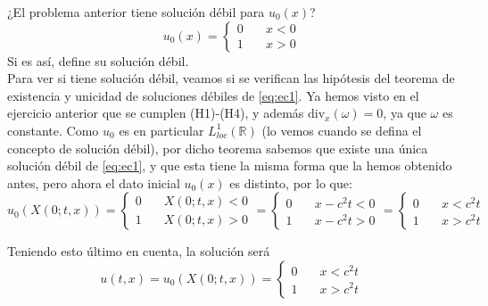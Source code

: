 \documentclass[12pt]{article}
\newcommand{\R}{\mathbb{R}}
\begin{document}
    \begin{ejercicio}
        ¿El problema anterior tiene solución débil para $u_0(x)$?
        $$u_0(x) = \begin{cases}
            0 \quad& x<0 \\
            1 \quad& x>0
        \end{cases}$$
        Si es así, define su solución débil. \\

        Para ver si tiene solución débil, veamos si se verifican las hipótesis del teorema de existencia y unicidad de soluciones débiles de \eqref{eq:ec1}. 
        Ya hemos visto en el ejercicio anterior que se cumplen (H1)-(H4), y además $\text{div}_x(\omega) = 0$, ya que $\omega$ es constante. Como $u_0$ es en particular $L_{loc}^1(\R)$ (lo vemos cuando
        se defina el concepto de solución débil), por dicho teorema sabemos que existe una única solución débil de \eqref{eq:ec1}, y que esta tiene la misma forma que la hemos obtenido antes, pero ahora el dato inicial $u_0(x)$ es distinto, por lo que:
        $$u_0(X(0;t,x)) = 
        \begin{cases}
            0 \quad& X(0;t,x) < 0 \\
            1 \quad& X(0;t,x) > 0
        \end{cases} = \begin{cases}
            0 \quad& x - c^2t < 0 \\
            1 \quad& x - c^2t > 0
        \end{cases} = \begin{cases}
            0 \quad& x < c^2t \\
            1 \quad& x > c^2t
        \end{cases}$$

        Teniendo esto último en cuenta, la solución será
        $$\boxed{u(t,x) = u_0(X(0;t,x)) = \begin{cases}
            0 \quad& x < c^2t \\
            1 \quad& x > c^2t
        \end{cases}}$$


\end{ejercicio}
\end{document}
